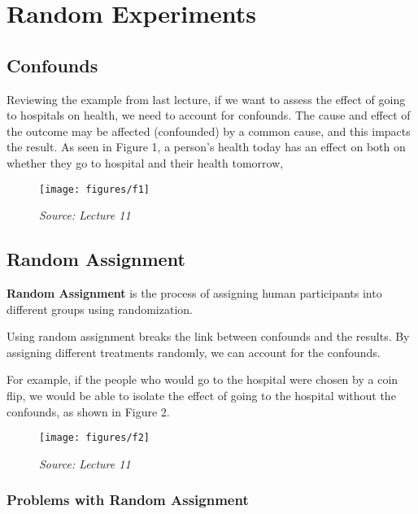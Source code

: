 \section{Random Experiments}

\subsection{Confounds}

Reviewing the example from last lecture, if we want to assess the effect of going to hospitals on health, we need to account for confounds. The cause and effect of the outcome may be affected (confounded) by a common cause, and this impacts the result. As seen in Figure 1, a person's health today has an effect on both on whether they go to hospital and their health tomorrow,

\begin{figure}[ht]
  \begin{center}
    \texttt{[image: figures/f1]}
        \caption{ \textit{ Source: Lecture 11}}
    \label{figure 1}
  \end{center}
\end{figure}

\subsection{Random Assignment}

\textbf{Random Assignment} is the process of assigning human participants into different groups using randomization.

Using random assignment breaks the link between confounds and the results. By assigning different treatments randomly, we can account for the confounds.

For example, if the people who would go to the hospital were chosen by a coin flip, we would be able to isolate the effect of going to the hospital without the confounds, as shown in Figure 2.

\begin{figure}[ht]
  \begin{center}
    \texttt{[image: figures/f2]}
        \caption{ \textit{ Source: Lecture 11}}
    \label{figure 2}
  \end{center}
\end{figure}

\subsubsection{Problems with Random Assignment}

